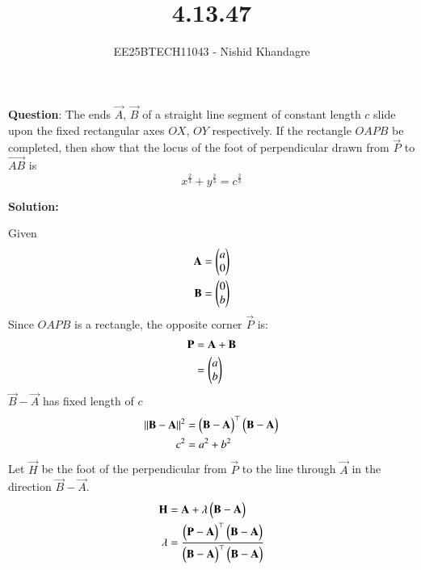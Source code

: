 \documentclass[journal]{IEEEtran}
\title{4.13.47}
\author{EE25BTECH11043 - Nishid Khandagre} %
\begin{document}
\maketitle

\renewcommand{\thefigure}{\theenumi}
\renewcommand{\thetable}{\theenumi}


\textbf{Question}:
The ends $\vec{A}$, $\vec{B}$ of a straight line segment of constant length $c$ slide upon the fixed rectangular axes $OX$, $OY$ respectively. If the rectangle $OAPB$ be completed, then show that the locus of the foot of perpendicular drawn from $\vec{P}$ to $\vec{AB}$ is
\[x^{\frac{2}{3}} + y^{\frac{2}{3}} = c^{\frac{2}{3}}\]

\textbf{Solution:}


Given
\begin{align}
\mathbf{A} &= \begin{pmatrix}a\\0\end{pmatrix} \\
\mathbf{B} &= \begin{pmatrix}0\\b\end{pmatrix}
\end{align}
Since $OAPB$ is a rectangle, the opposite corner $\vec{P}$ is:
\begin{align}
\mathbf{P} &= \mathbf{A} + \mathbf{B} \\
&= \begin{pmatrix}a \\ b\end{pmatrix}
\end{align}
$\vec{B}-\vec{A}$ has fixed length of $c$
\begin{align}
\left\lVert\mathbf{B}-\mathbf{A}\right\rVert^2 &= \begin{pmatrix}\mathbf{B}-\mathbf{A}\end{pmatrix}^\top\begin{pmatrix}\mathbf{B}-\mathbf{A}\end{pmatrix} \\
c^2&= a^2+b^2
\end{align}
Let $\vec{H}$ be the foot of the perpendicular from $\vec{P}$ to the line through $\vec{A}$ in the direction $\vec{B}-\vec{A}$.
\begin{align}
\mathbf{H} &= \mathbf{A} + \lambda\begin{pmatrix}\mathbf{B}-\mathbf{A}\end{pmatrix} \\
\lambda &= \frac{\begin{pmatrix}\mathbf{P}-\mathbf{A}\end{pmatrix}^\top\begin{pmatrix}\mathbf{B}-\mathbf{A}\end{pmatrix}}{\begin{pmatrix}\mathbf{B}-\mathbf{A}\end{pmatrix}^\top\begin{pmatrix}\mathbf{B}-\mathbf{A}\end{pmatrix}}
\end{align}
\end{document}
